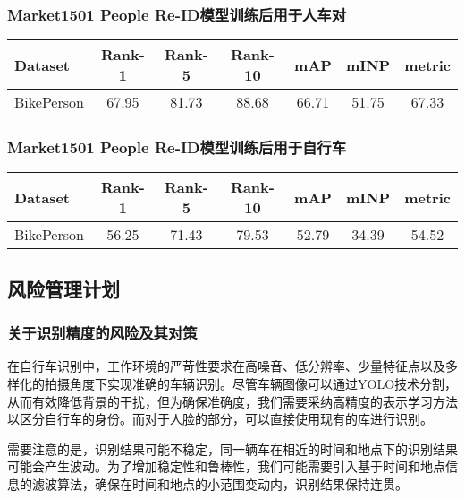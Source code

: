 \documentclass{article}
\begin{document}
\subsubsection{Market1501 People Re-ID模型训练后用于人车对}
\begin{table}[H]
\centering
\begin{tabular}{l|cccccc}
\toprule
Dataset & Rank-1 & Rank-5 & Rank-10 & mAP & mINP & metric \\
\midrule
BikePerson & 67.95 & 81.73 & 88.68 & 66.71 & 51.75 & 67.33 \\
\bottomrule
\end{tabular}
\end{table}

\subsubsection{Market1501 People Re-ID模型训练后用于自行车}
\begin{table}[H]
\centering
\begin{tabular}{l|cccccc}
\toprule
Dataset & Rank-1 & Rank-5 & Rank-10 & mAP & mINP & metric \\
\midrule
BikePerson & 56.25 & 71.43 & 79.53 & 52.79 & 34.39 & 54.52 \\
\bottomrule
\end{tabular}
\end{table}

\subsection{}

\subsection{风险管理计划}
\subsubsection{关于识别精度的风险及其对策}

在自行车识别中，工作环境的严苛性要求在高噪音、低分辨率、少量特征点以及多样化的拍摄角度下实现准确的车辆识别。尽管车辆图像可以通过YOLO技术分割，从而有效降低背景的干扰，但为确保准确度，我们需要采纳高精度的表示学习方法以区分自行车的身份。而对于人脸的部分，可以直接使用现有的库进行识别。

需要注意的是，识别结果可能不稳定，同一辆车在相近的时间和地点下的识别结果可能会产生波动。为了增加稳定性和鲁棒性，我们可能需要引入基于时间和地点信息的滤波算法，确保在时间和地点的小范围变动内，识别结果保持连贯。\\
\end{document}
